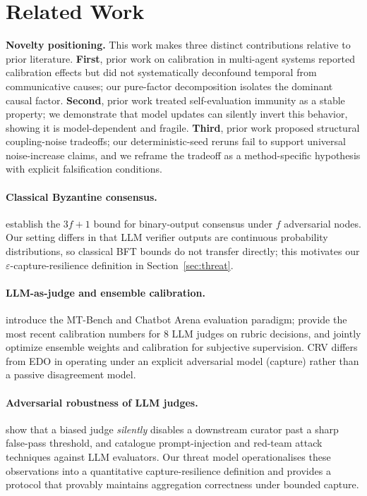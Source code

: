 \documentclass[11pt]{article}
\begin{document}
\section{Related Work}
\textbf{Novelty positioning.} This work makes three distinct contributions relative to prior literature. \textbf{First}, prior work on calibration in multi-agent systems reported calibration effects but did not systematically deconfound temporal from communicative causes; our pure-factor decomposition isolates the dominant causal factor. \textbf{Second}, prior work treated self-evaluation immunity as a stable property; we demonstrate that model updates can silently invert this behavior, showing it is model-dependent and fragile. \textbf{Third}, prior work proposed structural coupling-noise tradeoffs; our deterministic-seed reruns fail to support universal noise-increase claims, and we reframe the tradeoff as a method-specific hypothesis with explicit falsification conditions.


\label{sec:related}


\paragraph{Classical Byzantine consensus.}
\citet{lamport1982byzantine,castro1999pbft,yin2019hotstuff} establish the
$3f+1$ bound for binary-output consensus under $f$ adversarial nodes. Our
setting differs in that LLM verifier outputs are continuous probability
distributions, so classical BFT bounds do not transfer directly; this
motivates our $\varepsilon$-capture-resilience definition in
Section~\ref{sec:threat}.

\paragraph{LLM-as-judge and ensemble calibration.}
\citet{zheng2023judging} introduce the MT-Bench and Chatbot Arena
evaluation paradigm; \citet{leung2026rubricllm} provide the most recent
calibration numbers for 8 LLM judges on rubric decisions, and
\citet{cui2026edo} jointly optimize ensemble weights and calibration for
subjective supervision. CRV differs from EDO in operating under an
explicit adversarial model (capture) rather than a passive disagreement
model.

\paragraph{Adversarial robustness of LLM judges.}
\citet{zhang2026blindcurator} show that a biased judge \emph{silently}
disables a downstream curator past a sharp false-pass threshold, and
\citet{perez2022red,schulhoff2023ignore} catalogue prompt-injection and
red-team attack techniques against LLM evaluators. Our threat model
operationalises these observations into a quantitative capture-resilience
definition and provides a protocol that provably maintains aggregation
correctness under bounded capture.
\end{document}

